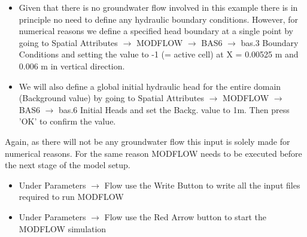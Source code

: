 \begin{itemize}
\item Given that there is no groundwater flow involved in this example there is in principle no need to define any hydraulic boundary conditions. However, for numerical reasons we define a specified head boundary at a single point by going to {\color{blue}Spatial Attributes} $\rightarrow$ {\color{blue}MODFLOW} $\rightarrow$ {\color{blue}BAS6} $\rightarrow$ {\color{blue}bas.3 Boundary Conditions} and setting the value to -1 (= active cell) at X = 0.00525 m and 0.006 m in vertical direction. 

\item We will also define a global initial hydraulic head for the entire domain (Background value) by going to {\color{blue}Spatial Attributes} $\rightarrow$ {\color{blue}MODFLOW} $\rightarrow$ {\color{blue}BAS6} $\rightarrow$ {\color{blue}bas.6 Initial Heads} and set the
 {\color{blue}Backg.} value to 1m. Then press {\color{blue}'OK'} to confirm the value.

\end{itemize}

Again, as there will not be any groundwater flow this input is solely made for numerical reasons.
For the same reason MODFLOW needs to be executed before the next stage of the model setup.

\begin{itemize}

\item Under {\color{blue}Parameters} $\rightarrow$ {\color{blue}Flow} use the {\color{blue}Write Button} to write all the input files required to run MODFLOW

\item Under {\color{blue}Parameters} $\rightarrow$ {\color{blue}Flow} use the 
{\color{blue}Red Arrow} button to start the MODFLOW simulation   

\end{itemize}


